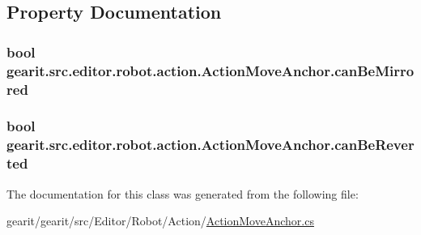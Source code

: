 \subsection{Property Documentation}
\hypertarget{classgearit_1_1src_1_1editor_1_1robot_1_1action_1_1_action_move_anchor_a01f9124ee9afe6e128ab1b3aebaba25b}{
\subsubsection[{can\+Be\+Mirrored}]{\setlength{\rightskip}{0pt plus 5cm}bool gearit.\+src.\+editor.\+robot.\+action.\+Action\+Move\+Anchor.\+can\+Be\+Mirrored\hspace{0.3cm}{\ttfamily [get]}}}\label{classgearit_1_1src_1_1editor_1_1robot_1_1action_1_1_action_move_anchor_a01f9124ee9afe6e128ab1b3aebaba25b}
\hypertarget{classgearit_1_1src_1_1editor_1_1robot_1_1action_1_1_action_move_anchor_ae8b39bfc7843941bf4288c3a0e8daffd}{
\subsubsection[{can\+Be\+Reverted}]{\setlength{\rightskip}{0pt plus 5cm}bool gearit.\+src.\+editor.\+robot.\+action.\+Action\+Move\+Anchor.\+can\+Be\+Reverted\hspace{0.3cm}{\ttfamily [get]}}}\label{classgearit_1_1src_1_1editor_1_1robot_1_1action_1_1_action_move_anchor_ae8b39bfc7843941bf4288c3a0e8daffd}


The documentation for this class was generated from the following file\+:\begin{DoxyCompactItemize}
\item 
gearit/gearit/src/\+Editor/\+Robot/\+Action/\hyperlink{_action_move_anchor_8cs}{Action\+Move\+Anchor.\+cs}\end{DoxyCompactItemize}
